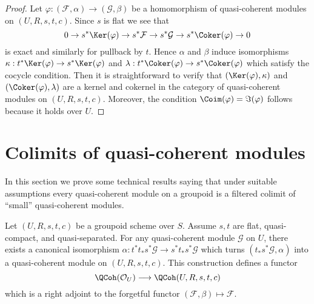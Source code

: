 \begin{proof}
Let $\varphi : (\mathcal{F}, \alpha) \to (\mathcal{G}, \beta)$ be a
homomorphism of quasi-coherent modules on $(U, R, s, t, c)$. Since
$s$ is flat we see that
$$
0 \to s^*\Ker(\varphi)
\to s^*\mathcal{F} \to s^*\mathcal{G} \to s^*\Coker(\varphi) \to 0
$$
is exact and similarly for pullback by $t$. Hence $\alpha$ and $\beta$
induce isomorphisms
$\kappa : t^*\Ker(\varphi) \to s^*\Ker(\varphi)$ and
$\lambda : t^*\Coker(\varphi) \to s^*\Coker(\varphi)$
which satisfy the cocycle condition. Then it is straightforward to
verify that $(\Ker(\varphi), \kappa)$ and
$(\Coker(\varphi), \lambda)$ are a kernel and cokernel in the
category of quasi-coherent modules on $(U, R, s, t, c)$. Moreover,
the condition $\Coim(\varphi) = \Im(\varphi)$ follows
because it holds over $U$.
\end{proof}













\section{Colimits of quasi-coherent modules}
\label{section-colimits}

\noindent
In this section we prove some technical results saying that under
suitable assumptions every quasi-coherent module on a groupoid is
a filtered colimit of ``small'' quasi-coherent modules.

\begin{lemma}
\label{lemma-construct-quasi-coherent}
Let $(U, R, s, t, c)$ be a groupoid scheme over $S$.
Assume $s, t$ are flat, quasi-compact, and quasi-separated.
For any quasi-coherent module $\mathcal{G}$ on $U$, there exists
a canonical isomorphism
$\alpha : t^*t_*s^*\mathcal{G} \to s^*t_*s^*\mathcal{G}$
which turns $(t_*s^*\mathcal{G}, \alpha)$ into a quasi-coherent module
on $(U, R, s, t, c)$. This construction defines a functor
$$
\QCoh(\mathcal{O}_U) \longrightarrow \QCoh(U, R, s, t, c)
$$
which is a right adjoint to the forgetful functor
$(\mathcal{F}, \beta) \mapsto \mathcal{F}$.
\end{lemma}

